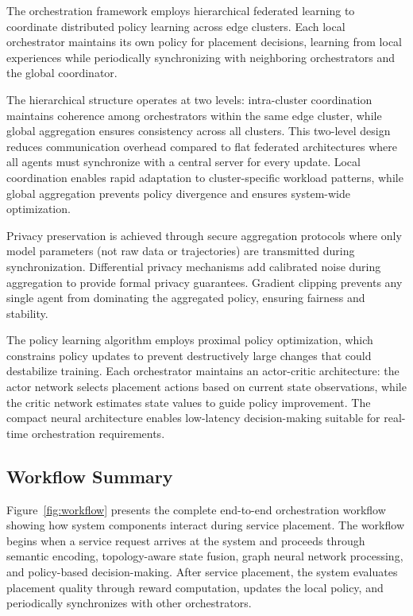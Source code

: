 The orchestration framework employs hierarchical federated learning to coordinate distributed policy learning across edge clusters. Each local orchestrator maintains its own policy for placement decisions, learning from local experiences while periodically synchronizing with neighboring orchestrators and the global coordinator.

The hierarchical structure operates at two levels: intra-cluster coordination maintains coherence among orchestrators within the same edge cluster, while global aggregation ensures consistency across all clusters. This two-level design reduces communication overhead compared to flat federated architectures where all agents must synchronize with a central server for every update. Local coordination enables rapid adaptation to cluster-specific workload patterns, while global aggregation prevents policy divergence and ensures system-wide optimization.

Privacy preservation is achieved through secure aggregation protocols where only model parameters (not raw data or trajectories) are transmitted during synchronization. Differential privacy mechanisms add calibrated noise during aggregation to provide formal privacy guarantees. Gradient clipping prevents any single agent from dominating the aggregated policy, ensuring fairness and stability.

The policy learning algorithm employs proximal policy optimization, which constrains policy updates to prevent destructively large changes that could destabilize training. Each orchestrator maintains an actor-critic architecture: the actor network selects placement actions based on current state observations, while the critic network estimates state values to guide policy improvement. The compact neural architecture enables low-latency decision-making suitable for real-time orchestration requirements.

\subsection{Workflow Summary}
\label{subsec:workflow}

Figure~\ref{fig:workflow} presents the complete end-to-end orchestration workflow showing how system components interact during service placement. The workflow begins when a service request arrives at the system and proceeds through semantic encoding, topology-aware state fusion, graph neural network processing, and policy-based decision-making. After service placement, the system evaluates placement quality through reward computation, updates the local policy, and periodically synchronizes with other orchestrators.

